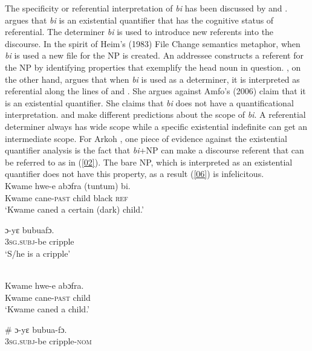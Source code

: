 \documentclass[output=paper,modfonts,nonflat,draftmode]{langsci/langscibook}
\begin{document}
The specificity or referential interpretation of \emph{bi} has been discussed by \citet{Amfo2009} and \citet{Arkoh2011}. \citet{Amfo2009} argues that \emph{bi} is an existential quantifier that has the cognitive status of referential. The determiner \emph{bi} is used to introduce new referents into the discourse. In the spirit of Heim's (1983) File Change semantics metaphor, when \emph{bi} is used a new file for the NP is created. An addressee constructs a referent for the NP by identifying properties that exemplify the head noun in question. \citet{Arkoh2011}, on the other hand, argues that when \emph{bi} is used as a determiner, it is interpreted as referential along the lines of \citet{FodorSag1982} and \citet{Kratzer1998}. She argues against Amfo's (2006) claim that it is an existential quantifier. She claims that \emph{bi} does not have a quantificational interpretation. \citet{Amfo2009} and \citet{Arkoh2011} make different predictions about the scope of \emph{bi}. A referential determiner always has wide scope while a specific existential indefinite can get an intermediate scope. For Arkoh \cite{Arkoh2011}, one piece of evidence against the existential quantifier analysis is the fact that \emph{bi}+NP can make a discourse referent that can be referred to as in (\ref{02}). The bare NP, which is interpreted as an existential quantifier does not have this property, as a result (\ref{06}) is infelicitous.    
\ea
{}\\
\ea\label{01} 
\gll Kwame  hwe-e  abɔfra (tuntum) bi.\\
 Kwame cane-\textsc{past} child black \textsc{ref}\\
 
\glt ‘Kwame caned a certain (dark) child.'

\ex\label{02}
\gll ɔ-yε bubuafɔ.\\
3\textsc{sg.subj}-be cripple\\
 
\glt ‘S/he is a cripple’
\z \z

\ea
{}\\
\ea\label{05} 
\gll Kwame  hwe-e  abɔfra.\\
 Kwame cane-\textsc{past} child \\
 
\glt ‘Kwame caned a child.'

\ex\label{06}
\gll \# ɔ-yε bubua-fɔ.\\
{} 3\textsc{sg.subj}-be cripple-\textsc{nom}\\
 
\end{document}
